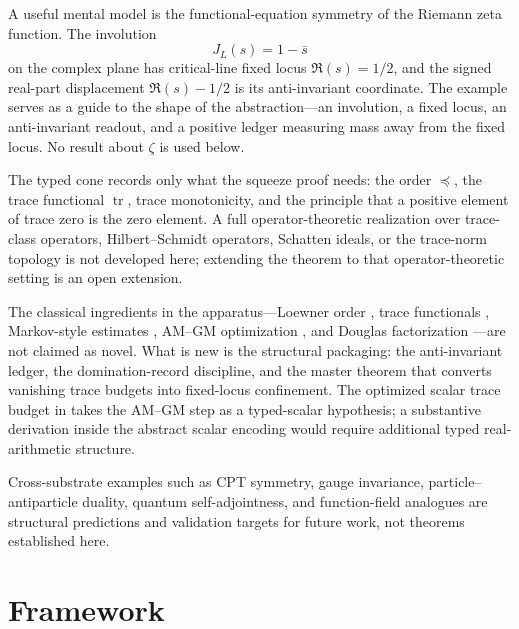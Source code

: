 \documentclass[11pt]{article}
\DeclareMathOperator{\trace}{tr}
\theoremstyle{definition}
\begin{document}
A useful mental model is the functional-equation symmetry of the
Riemann zeta function.  The involution
\[
  J_L(s)=1-\bar{s}
\]
on the complex plane has critical-line fixed locus
\(\Re(s)=1/2\), and the signed real-part displacement
\(\Re(s)-1/2\) is its anti-invariant coordinate.  The example serves
as a guide to the shape of the abstraction---an involution, a
fixed locus, an anti-invariant readout, and a positive ledger
measuring mass away from the fixed locus.  No result about
\(\zeta\) is used below.

The typed cone records only what the squeeze proof needs: the order
\(\preceq\), the trace functional \(\trace\), trace monotonicity,
and the principle that a positive element of trace zero is the zero
element.  A full operator-theoretic realization over trace-class
operators, Hilbert--Schmidt operators, Schatten ideals, or the
trace-norm topology \citep{Simon2005,ReedSimon1980} is not developed
here; extending the theorem to that operator-theoretic setting is an
open extension.

The classical ingredients in the apparatus---Loewner order
\citep{Loewner1934,Bhatia1997}, trace functionals
\citep{Simon2005}, Markov-style estimates \citep{Folland1999},
AM--GM optimization \citep{HardyLittlewoodPolya1952}, and Douglas
factorization \citep{Douglas1966}---are not claimed as novel.  What
is new is the structural packaging: the anti-invariant ledger, the
domination-record discipline, and the master theorem that converts
vanishing trace budgets into fixed-locus confinement.  The optimized
scalar trace budget in 
takes the AM--GM step as a typed-scalar hypothesis; a substantive
derivation inside the abstract scalar encoding would require
additional typed real-arithmetic structure.

Cross-substrate examples such as CPT symmetry, gauge invariance,
particle--antiparticle duality, quantum self-adjointness, and
function-field analogues are structural predictions and validation
targets for future work, not theorems established here.
 

\section{Framework}
\label{sec:framework}
\end{document}
